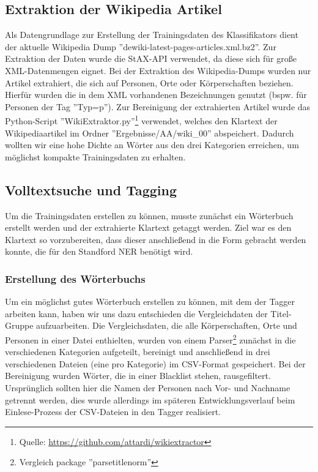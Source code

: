 \documentclass[a4paper]{article}
\begin{document}
	\subsection{Extraktion der Wikipedia Artikel}
		Als Datengrundlage zur Erstellung der Trainingsdaten des Klassifikators dient der aktuelle Wikipedia Dump ''dewiki-latest-pages-articles.xml.bz2''.
		Zur Extraktion der Daten wurde die StAX-API verwendet, da diese sich für große XML-Datenmengen eignet.
		Bei der Extraktion des Wikipedia-Dumps wurden nur Artikel extrahiert, die sich auf Personen, Orte oder Körperschaften beziehen. Hierfür wurden die in dem XML vorhandenen Bezeichnungen genutzt (bspw. für Personen der Tag ''Typ=p'').
		Zur Bereinigung der extrahierten Artikel wurde das Python-Script ''WikiExtraktor.py''\footnote{Quelle: \url{https://github.com/attardi/wikiextractor}} verwendet, welches den Klartext der Wikipediaartikel im Ordner ''Ergebnisse/AA/wiki\_00'' abspeichert. Dadurch wollten wir eine hohe Dichte an Wörter aus den drei Kategorien erreichen, um möglichst kompakte Trainingsdaten zu erhalten.

	\subsection{Volltextsuche und Tagging}
		Um die Trainingsdaten erstellen zu können, musste zunächst ein Wörterbuch erstellt werden und der extrahierte Klartext getaggt werden.
		Ziel war es den Klartext so vorzubereiten, dass dieser anschließend in die Form gebracht werden konnte, die für den Standford NER benötigt wird.

		\subsubsection{Erstellung des Wörterbuchs}
			Um ein möglichst gutes Wörterbuch erstellen zu können, mit dem der Tagger arbeiten kann, haben wir uns dazu entschieden die Vergleichdaten der Titel-Gruppe aufzuarbeiten.
			Die Vergleichsdaten, die alle Körperschaften, Orte und Personen in einer Datei enthielten, wurden von einem Parser\footnote{Vergleich package ''parsetitlenorm''} zunächst in die verschiedenen Kategorien aufgeteilt, bereinigt und anschließend in drei verschiedenen Dateien (eine pro Kategorie) im CSV-Format gespeichert.
			Bei der Bereinigung wurden Wörter, die in einer Blacklist stehen, rausgefiltert.
			Ursprünglich sollten hier die Namen der Personen nach Vor- und Nachname getrennt werden, dies wurde allerdings im späteren Entwicklungsverlauf beim Einlese-Prozess der CSV-Dateien in den Tagger realisiert.
\end{document}
